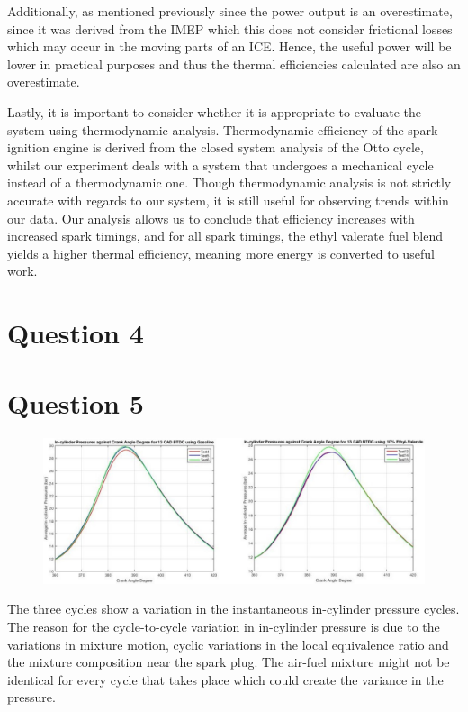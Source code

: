 \documentclass[11pt]{article}
\begin{document}
Additionally, as mentioned previously since the power output is an overestimate, since it was derived from the IMEP which this does not consider frictional losses which may occur in the moving parts of an ICE. Hence, the useful power will be lower in practical purposes and thus the thermal efficiencies calculated are also an overestimate. 

Lastly, it is important to consider whether it is appropriate to evaluate the system using thermodynamic analysis. Thermodynamic efficiency of the spark ignition engine is derived from the closed system analysis of the Otto cycle, whilst our experiment deals with a system that undergoes a mechanical cycle instead of a thermodynamic one. Though thermodynamic analysis is not strictly accurate with regards to our system, it is still useful for observing trends within our data. Our analysis allows us to conclude that efficiency increases with increased spark timings, and for all spark timings, the ethyl valerate fuel blend yields a higher thermal efficiency, meaning more energy is converted to useful work.  
\section*{Question 4}
\section*{Question 5}
\begin{figure}[H]
    \centering
    \includegraphics[width = \textwidth]{./img/diagram3.png}
    \caption{}
    \label{q5-f1}
\end{figure}
The three cycles show a variation in the instantaneous in-cylinder pressure cycles. The reason for the cycle-to-cycle variation in in-cylinder pressure is due to the variations in mixture motion, cyclic variations in the local equivalence ratio and the mixture composition near the spark plug. The air-fuel mixture might not be identical for every cycle that takes place which could create the variance in the pressure.  
\end{document}
